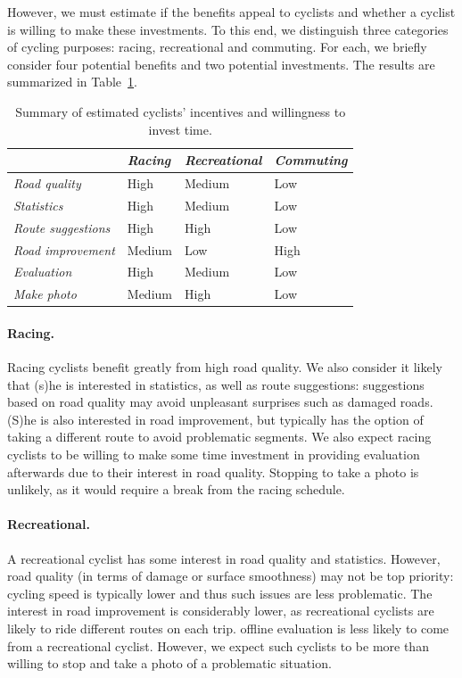 \documentclass[a4paper,11pt]{article}
\begin{document}
However, we must estimate if the benefits appeal to cyclists and whether a cyclist is willing 
to make these investments. To this end, we distinguish three categories of cycling purposes: 
racing, recreational and commuting. For each, we briefly consider four potential benefits 
and two potential investments. The results are summarized in Table~\ref{tab:incentives}.

\begin{table}[b]
\centering
\begin{tabular}{l | l l l}
 & \emph{Racing} & \emph{Recreational} & \emph{Commuting}\\
\hline
\emph{Road quality} & High & Medium & Low \\
\emph{Statistics} & High & Medium & Low \\
\emph{Route suggestions} & High & High & Low \\
\emph{Road improvement} & Medium & Low & High \\
\hline
\emph{Evaluation} & High & Medium & Low \\
\emph{Make photo} & Medium & High & Low
\end{tabular}
\caption{Summary of estimated cyclists' incentives and willingness to invest time.}
\label{tab:incentives}
\end{table}

\paragraph{Racing.}
Racing cyclists benefit greatly from high road quality. 
We also consider it likely that (s)he is interested in statistics, as well as route 
suggestions: suggestions based on road quality may avoid unpleasant 
surprises such as damaged roads. (S)he is also interested in road improvement, 
but typically has the option of taking a different route to avoid problematic segments. 
We also expect racing cyclists to be willing to make some time investment in providing 
evaluation afterwards due to their interest in road quality. 
Stopping to take a photo is unlikely, as it would require a break from the racing schedule.

\paragraph{Recreational.}
A recreational cyclist has some interest in road quality and statistics. 
However, road quality (in terms of damage or surface smoothness) may not be top priority: 
cycling speed is typically lower and thus such issues are less problematic. 
The interest in road improvement is considerably lower, 
as recreational cyclists are likely to ride different routes on each trip. 
offline evaluation is less likely to come from a recreational cyclist. 
However, we expect such cyclists to be more than willing to stop and 
take a photo of a problematic situation.
\end{document}
